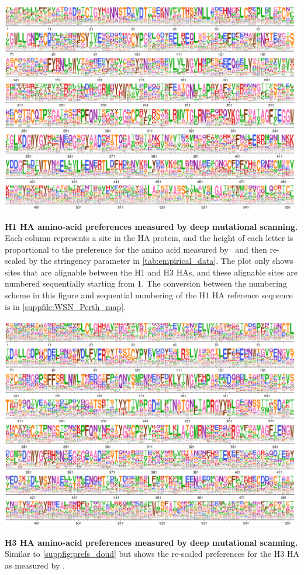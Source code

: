 \documentclass[11pt]{article}
\begin{document}
\begin{suppfig}[H]
\centerline{\includegraphics[width=\textwidth]{figures/prefs_doud}}
\caption{\label{suppfig:prefs_doud}
\textbf{H1 HA amino-acid preferences measured by deep mutational scanning.}
Each column represents a site in the HA protein, and the height of each letter is proportional to the preference for the amino acid measured by~\citet{doud2016accurate} and then re-scaled by the stringency parameter in \ref{tab:empirical_data}. 
The plot only shows sites that are alignable between the H1 and H3 HAs, and these alignable sites are numbered sequentially starting from 1.
The conversion between the numbering scheme in this figure and sequential numbering of the H1 HA reference sequence is in \ref{suppfile:WSN_Perth_map}. 
}
\end{suppfig}
\clearpage 


\begin{suppfig}[H]
\centerline{\includegraphics[width=\textwidth]{figures/prefs_lee}}
\caption{\label{suppfig:prefs_lee}
\textbf{H3 HA amino-acid preferences measured by deep mutational scanning.}
Similar to \ref{suppfig:prefs_doud} but shows the re-scaled preferences for the H3 HA as measured by \citet{lee2018deep}.
 }
\end{suppfig}
\clearpage 
\end{document}
